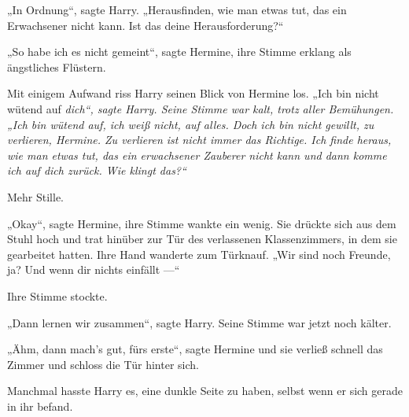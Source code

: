 „In Ordnung“, sagte Harry.
„Herausfinden, wie man etwas tut, das ein Erwachsener nicht kann. Ist das deine Herausforderung?“

„So habe ich es nicht gemeint“, sagte Hermine, ihre Stimme erklang als ängstliches Flüstern.

Mit einigem Aufwand riss Harry seinen Blick von Hermine los.
„Ich bin nicht wütend auf \emph{dich“, sagte Harry. Seine Stimme war kalt, trotz aller Bemühungen.
„Ich bin wütend auf, ich weiß nicht, auf alles. Doch ich bin nicht gewillt, zu verlieren, Hermine. Zu verlieren ist nicht immer das Richtige. Ich finde heraus, wie man etwas tut, das ein erwachsener Zauberer nicht kann und dann komme ich auf dich zurück. Wie klingt das?“}

Mehr Stille.

„Okay“, sagte Hermine, ihre Stimme wankte ein wenig. Sie drückte sich aus dem Stuhl hoch und trat hinüber zur Tür des verlassenen Klassenzimmers, in dem sie gearbeitet hatten. Ihre Hand wanderte zum Türknauf.
„Wir sind noch Freunde, ja? Und wenn dir nichts einfällt —“

Ihre Stimme stockte.

„Dann lernen wir zusammen“, sagte Harry. Seine Stimme war jetzt noch kälter.

„Ähm, dann mach’s gut, fürs erste“, sagte Hermine und sie verließ schnell das Zimmer und schloss die Tür hinter sich.

Manchmal hasste Harry es, eine dunkle Seite zu haben, selbst wenn er sich gerade in ihr befand.

